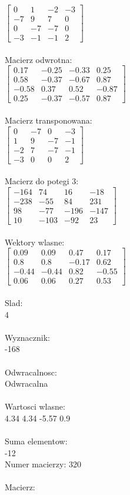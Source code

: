 \documentclass[a4paper,12pt]{article}
\begin{document}
$\begin{bmatrix} 0&1&-2&-3\\-7&9&7&0\\0&-7&-7&0\\-3&-1&-1&2 \end{bmatrix}$
\\
\\
Macierz odwrotna:\\

$\begin{bmatrix} 0.17&-0.25&-0.33&0.25\\0.58&-0.37&-0.67&0.87\\-0.58&0.37&0.52&-0.87\\0.25&-0.37&-0.57&0.87 \end{bmatrix}$
\\
\\
Macierz transponowana:\\

$\begin{bmatrix} 0&-7&0&-3\\1&9&-7&-1\\-2&7&-7&-1\\-3&0&0&2 \end{bmatrix}$
\\
\\
Macierz do potegi 3:\\

$\begin{bmatrix} -164&74&16&-18\\-238&-55&84&231\\98&-77&-196&-147\\10&-103&-92&23 \end{bmatrix}$
\\
\\
Wektory wlasne:\\

$\begin{bmatrix} 0.09&0.09&0.47&0.17\\0.8&0.8&-0.17&0.62\\-0.44&-0.44&0.82&-0.55\\0.06&0.06&0.27&0.53 \end{bmatrix}$
\\
\\
Slad:\\
4
\\
\\
Wyznacznik:\\
-168
\\
\\
Odwracalnosc:\\
Odwracalna
\\
\\
Wartosci wlasne:\\
4.34 4.34 -5.57 0.9
\\
\\
Suma elementow:\\
-12
\\
\newpage
Numer macierzy:
320
\\
\\
Macierz:\\
\end{document}
